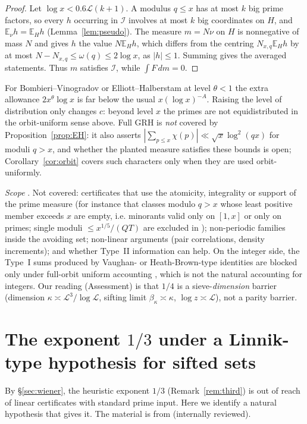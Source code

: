 \documentclass[11pt,reqno]{amsart}
\theoremstyle{definition}
\newcommand{\Lc}{\mathcal L}
\newcommand{\E}{\mathbb E}
\begin{document}
\begin{proof}
Let $\log x<0.6\Lc(k+1)$.  A modulus $q\le x$ has at most $k$ big prime
factors, so every $h$ occurring in $\mathcal I$ involves at most $k$ big coordinates on
$H$, and $\E_\nu h=\E_Hh$ (Lemma~\ref{lem:pseudo}).  The measure $m=N\nu$ on $H$ is
nonnegative of mass $N$ and gives $h$ the value $N\E_Hh$, which differs from the
centring $N_{x,q}\E_Hh$ by at most $N-N_{x,q}\le\omega(q)\le2\log x$, as $|h|\le1$.  Summing
gives the averaged statements.  Thus $m$ satisfies $\mathcal I$, while $\int F\,dm=0$.
\end{proof}

For Bombieri--Vinogradov or Elliott--Halberstam at level $\theta<1$ the extra
allowance $2x^\theta\log x$ is far below the usual $x(\log x)^{-A}$.
Raising the level of distribution only changes $c$: beyond level $x$ the
primes are not equidistributed in the orbit-uniform sense above.  Full
GRH is \emph{not} covered by Proposition~\ref{prop:EH}: it also asserts
$|\sum_{p\le x}\chi(p)|\ll\sqrt x\log^2(qx)$ for moduli $q>x$, and whether the planted
measure satisfies these bounds is open; Corollary~\ref{cor:orbit} covers
such characters only when they are used orbit-uniformly.

\emph{Scope} \cite[\S6]{O15}.  Not covered: certificates that use the
atomicity, integrality or support of the prime measure (for instance that
classes modulo $q>x$ whose least positive member exceeds $x$ are empty, i.e.
minorants valid only on $[1,x]$ or only on primes; single moduli
$\le x^{1/5}/(QT)$ are excluded in \cite[Prop.~5.2]{O15}); non-periodic families inside
the avoiding set; non-linear arguments (pair correlations, density
increments); and whether Type~II information can help.  On the integer
side, the Type~I sums produced by Vaughan- or Heath-Brown-type identities
are blocked only under full-orbit uniform accounting
\cite[Prop.~4.1]{O15}, which is not the natural accounting for integers.  Our
reading (Assessment) is that $1/4$ is a sieve-\emph{dimension} barrier
(dimension $\kappa\asymp\Lc^3/\log\Lc$, sifting limit $\beta_\kappa\asymp\kappa$, $\log z\asymp\Lc$), not a
parity barrier.

\section{The exponent \texorpdfstring{$1/3$}{1/3} under a Linnik-type hypothesis for sifted sets}\label{sec:LS}

By \S\ref{sec:wiener}, the heuristic exponent $1/3$ (Remark~\ref{rem:third}) is out
of reach of linear certificates with standard prime input.  Here we
identify a natural hypothesis that gives it.  The material is from
\cite{O16} (internally reviewed).
\end{document}
